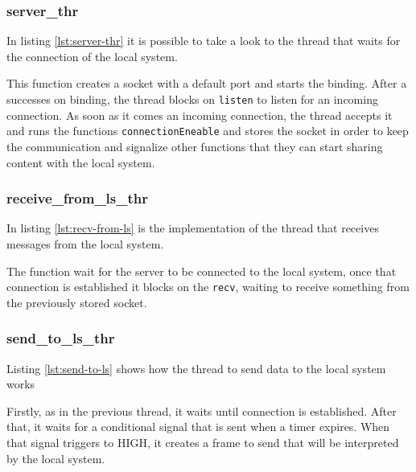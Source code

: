\subsubsection{server\_thr}
In listing \ref{lst:server-thr} it is possible to take a look to the thread that waits for the connection of the local system.
%
%

This function creates a socket with a default port and starts the binding.
After a successes on binding, the thread blocks on \texttt{listen} to listen for an incoming connection.
As soon as it comes an incoming connection, the thread accepts it and runs the functions \texttt{connectionEneable} and stores the socket in order to keep the communication and signalize other functions that they can start sharing content with the local system.

\subsubsection{receive\_from\_ls\_thr}
In listing \ref{lst:recv-from-ls} is the implementation of the thread that receives messages from the local system.
%
%

The function wait for the server to be connected to the local system, once that connection is established it blocks on the \texttt{recv}, waiting to receive something from the previously stored socket.

\subsubsection{send\_to\_ls\_thr}
Listing \ref{lst:send-to-ls} shows how the thread to send data to the local system works
%
%

Firstly, as in the previous thread, it waits until connection is established. After that, it waits for a conditional signal that is sent when a timer expires. When that signal triggers to HIGH, it creates a frame to send that will be interpreted by the local system.

